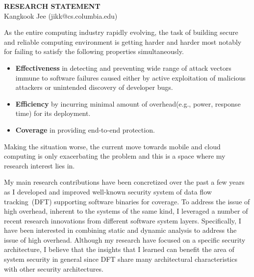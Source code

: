 \documentclass[letterpaper, 10pt]{article}
\begin{document}
\begin{small}

\begin{center}
{\LARGE \bf RESEARCH STATEMENT}\\
\vspace*{0.1cm}
{\normalsize Kangkook Jee (jikk@cs.columbia.edu)}
\end{center}



As the entire computing industry rapidly evolving, the task of building secure
and  reliable computing environment is getting harder and harder most notably
for failing to satisfy the following properties simultaneously.

\begin{itemize}

        \item {\bf Effectiveness} in detecting and preventing wide range of
                attack vectors immune to software failures caused either by
                active exploitation of malicious attackers or unintended
                discovery of developer bugs.

        \item {\bf Efficiency} by incurring minimal amount of overhead(e.g.,
                power, response time) for its deployment.

        \item {\bf Coverage} in providing end-to-end protection.  

\end{itemize}

Making the situation worse, the current move towards mobile and cloud computing
is only exacerbating the problem and this is a space where my research interest
lies in.

My main research contributions have been concretized over the past a few years
as I developed and improved well-known security system of data flow
tracking~(DFT) supporting software binaries for coverage.
%
To address the issue of high overhead, inherent to the systems of the same
kind, I leveraged a number of recent research innovations from different
software system layers. Specifically, I have been interested in combining
static and dynamic analysis to address the issue of high overhead.
%
Although my research have focused on a specific security architecture, I
believe that the insights that I learned can benefit the area of system
security in general since DFT share many architectural characteristics with
other security architectures.


\end{small}
\end{document}
